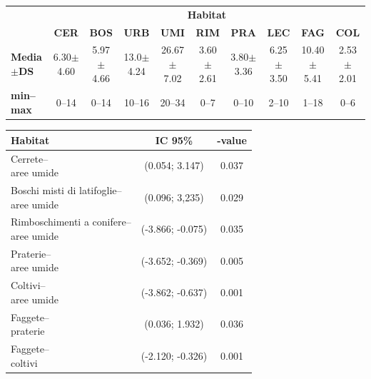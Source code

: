 \begin{multicols}{2}
\begin{table}[t]
\centering\small
\begin{tabular}{lccccccccc}
 & \multicolumn{9}{c}{\textbf{Habitat}}\\
 & \textbf{CER} & \textbf{BOS} & \textbf{URB} & \textbf{UMI} & \textbf{RIM} & \textbf{PRA} & \textbf{LEC} & \textbf{FAG} & \textbf{COL} \\
\hline
\textbf{Media$\pm$DS}&6.30$\pm$4.60&5.97$\pm$4.66&13.0$\pm$4.24&26.67$\pm$7.02&3.60$\pm$2.61&3.80$\pm$3.36&6.25$\pm$3.50&10.40$\pm$5.41&2.53$\pm$2.01\\
\textbf{min--max}&0--14&0--14&10--16&20--34&0--7&0--10&2--10&1--18&0--6\\
\end{tabular}
\end{table}

\begin{center}
\centering\small
\begin{tabular}{lcc}
\textbf{Habitat}& \textbf{IC 95\%} & \textbf{\prob{}-value} \\
\hline
\shortstack[l]{Cerrete--\\aree umide}&(0.054; 3.147)&0.037\\
\shortstack[l]{Boschi misti di latifoglie--\\aree umide}&(0.096; 3,235)&0.029\\
\shortstack[l]{Rimboschimenti a conifere--\\aree umide}&(-3.866; -0.075)&0.035\\
\shortstack[l]{Praterie--\\aree umide}&(-3.652; -0.369)&0.005\\
\shortstack[l]{Coltivi--\\aree umide}&(-3.862; -0.637)&0.001\\
\shortstack[l]{Faggete--\\praterie}&(0.036; 1.932)&0.036\\
\shortstack[l]{Faggete--\\coltivi}&(-2.120; -0.326)&0.001\\
\end{tabular}
\end{center}


\end{multicols}
